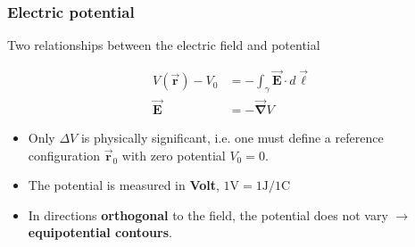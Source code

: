 \documentclass{beamer}
\newcommand{\vc}[1]{\vec{\boldsymbol{#1}}}
\begin{document}
\begin{frame}
	\frametitle{Electric potential}
	\small
	Two relationships between the electric field and potential
\begin{block}{}
\begin{align}V(\vc{r})-V_{0}&=-\int_{\gamma}\vc{E} \cdot d \vc{\ell}\\
\vc{E} &= -\vc{\nabla}V
\end{align}
\end{block}

	
	\begin{itemize}
	\item Only $\Delta V$ is physically significant, i.e. one must define a reference configuration $\vc{r}_0$ with zero potential $V_0=0$. 
	\item The potential is measured in \textbf{Volt}, $\unit{1\volt}= 1\unit{\joule}/1\unit{\coulomb}$
	\item In directions \textbf{orthogonal} to the field, the potential does not vary $\rightarrow$ \textbf{equipotential contours}.
\end{itemize}
\end{frame}


%
%
%
%
\end{document}
